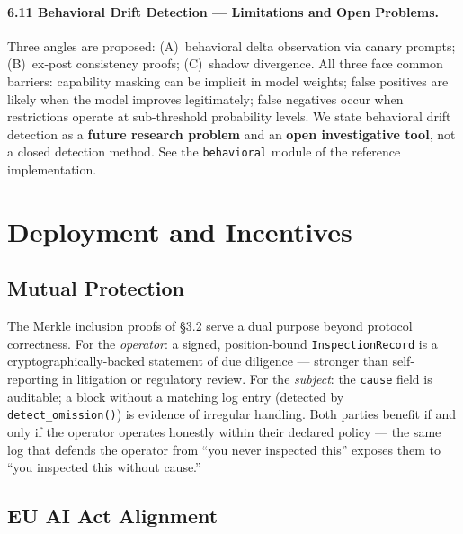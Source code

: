\documentclass[11pt,a4paper]{article}
\newcommand{\code}[1]{\texttt{#1}}
\begin{document}
\paragraph{6.11 Behavioral Drift Detection --- Limitations and Open Problems.}
\label{limit:drift}
Three angles are proposed: (A)~behavioral delta observation via canary prompts;
(B)~ex-post consistency proofs; (C)~shadow divergence. All three face common barriers:
capability masking can be implicit in model weights; false positives are likely when the
model improves legitimately; false negatives occur when restrictions operate at
sub-threshold probability levels. We state behavioral drift detection as a
\textbf{future research problem} and an \textbf{open investigative tool}, not a closed
detection method. See the \code{behavioral} module of the reference
implementation.

\section{Deployment and Incentives}
\label{sec:deployment}

\subsection{Mutual Protection}

The Merkle inclusion proofs of \S3.2 serve a dual purpose beyond protocol correctness.
For the \textit{operator}: a signed, position-bound \code{InspectionRecord} is a
cryptographically-backed statement of due diligence --- stronger than self-reporting in
litigation or regulatory review. For the \textit{subject}: the \code{cause} field is
auditable; a block without a matching log entry (detected by \code{detect\_omission()})
is evidence of irregular handling. Both parties benefit if and only if the operator
operates honestly within their declared policy --- the same log that defends the operator
from ``you never inspected this'' exposes them to ``you inspected this without cause.''

\subsection{EU AI Act Alignment}
\end{document}
